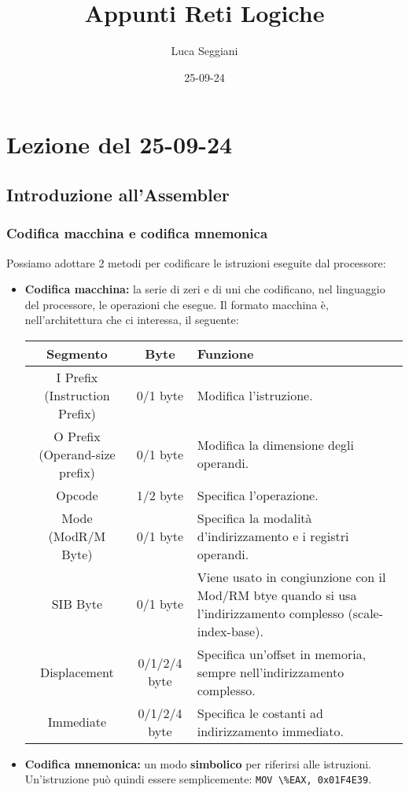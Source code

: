 \documentclass[a4paper,11pt]{article}
\title{Appunti Reti Logiche}
\author{Luca Seggiani}
\date{25-09-24}
\begin{document}
\section{Lezione del 25-09-24}

\thispagestyle{empty}
\pagestyle{fancy}

\subsection{Introduzione all'Assembler}

\subsubsection{Codifica macchina e codifica mnemonica}
Possiamo adottare 2 metodi per codificare le istruzioni eseguite dal processore:

\begin{itemize}
	\item \textbf{Codifica macchina:} la serie di zeri e di uni che codificano, nel linguaggio del processore, le operazioni che esegue.
		Il formato macchina è, nell'architettura che ci interessa, il seguente:

		\begin{table}[h!]
			\center {}
			\begin{tabular} { c | c | p{7cm} }
				\bfseries Segmento & \bfseries Byte & \bfseries Funzione \\
				\hline 
				I Prefix (Instruction Prefix) & 0/1 byte & Modifica l'istruzione. \\ 
				O Prefix (Operand-size prefix) & 0/1 byte & Modifica la dimensione degli operandi. \\
				Opcode & 1/2 byte & Specifica l'operazione. \\
				Mode (ModR/M Byte) & 0/1 byte & Specifica la modalità d'indirizzamento e i registri operandi. \\ 
				SIB Byte & 0/1 byte & Viene usato in congiunzione con il Mod/RM btye quando si usa l'indirizzamento complesso (scale-index-base). \\
				Displacement & 0/1/2/4 byte & Specifica un'offset in memoria, sempre nell'indirizzamento complesso. \\
				Immediate & 0/1/2/4 byte & Specifica le costanti ad indirizzamento immediato.
			\end{tabular}
		\end{table}

	\item \textbf{Codifica mnemonica:} un modo \textbf{simbolico} per riferirsi alle istruzioni.
		Un'istruzione può quindi essere semplicemente: \lstinline|MOV \%EAX, 0x01F4E39|.
\end{itemize}
\end{document}
